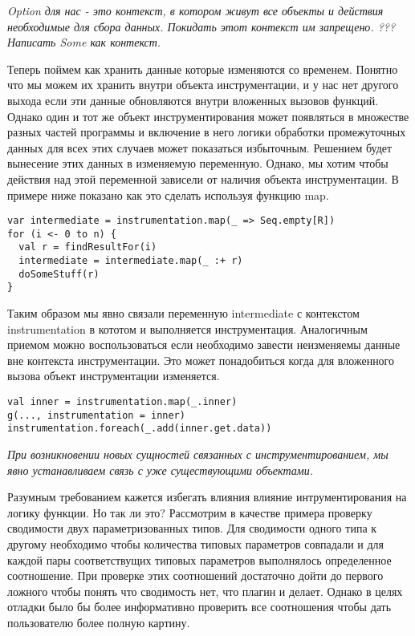 \textit{
Option для нас - это контекст, в котором живут все объекты и действия необходимые
для сбора данных. Покидать этот контекст им запрещено.
???
Написать Some как контекст.
}

Теперь поймем как хранить данные которые изменяются со временем.
Понятно что мы можем их хранить внутри объекта инструментации, и у нас нет другого
выхода если эти данные обновляются внутри вложенных вызовов функций.
Однако один и тот же объект инструментирования может появляться в множестве разных
частей программы и включение в него логики обработки промежуточных данных для
всех этих случаев может показаться избыточным.
Решением будет вынесение этих данных в изменяемую переменную.
Однако, мы хотим чтобы действия над этой переменной зависели от наличия объекта
инструментации.
В примере ниже показано как это сделать используя функцию map.

\begin{samepage}
\begin{lstlisting}[caption={Привязка к контексту инструментации}]
var intermediate = instrumentation.map(_ => Seq.empty[R])
for (i <- 0 to n) {
  val r = findResultFor(i)
  intermediate = intermediate.map(_ :+ r)
  doSomeStuff(r)
}
\end{lstlisting}
\end{samepage}

Таким образом мы явно связали переменную intermediate с контекстом instrumentation
в кототом и выполняется инструментация.
Аналогичным приемом можно воспользоваться если необходимо завести неизменяемы данные
вне контекста инструментации.
Это может понадобиться когда для вложенного вызова объект инструментации изменяется.

\begin{samepage}
\begin{lstlisting}[caption={Создание нового объекта инструментации}]
val inner = instrumentation.map(_.inner)
g(..., instrumentation = inner)
instrumentation.foreach(_.add(inner.get.data))
\end{lstlisting}
\end{samepage}

\textit{При возникновении новых сущностей связанных с
инструментированием, мы явно устанавливаем связь с уже существующими объектами.}

Разумным требованием кажется избегать влияния влияние интрументирования на
логику функции.
Но так ли это?
Рассмотрим в качестве примера проверку сводимости двух параметризованных типов.
Для сводимости одного типа к другому необходимо чтобы количества типовых параметров
совпадали и для каждой пары соответствущих типовых параметров выполнялось определенное соотношение.
При проверке этих соотношений достаточно дойти до первого ложного чтобы понять что
сводимость нет, что плагин и делает.
Однако в целях отладки было бы более информативно проверить все соотношения чтобы дать
пользователю более полную картину.

